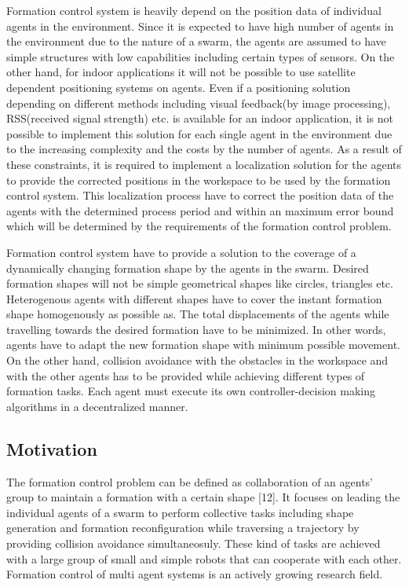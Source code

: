 \documentclass[twoside]{article}
\begin{document}
Formation control system is heavily depend on the position data of individual agents in the environment. Since it is expected to have high number of agents in the environment due to the nature of a swarm, the agents are assumed to have simple structures with low capabilities including certain types of sensors. On the other hand, for indoor applications it will not be possible to use satellite dependent positioning systems on agents. Even if a positioning solution depending on different methods including visual feedback(by image processing), RSS(received signal strength) etc. is available for an indoor application, it is not possible to implement this solution for each single agent in the environment due to the increasing complexity and the costs by the number of agents. As a result of these constraints, it is required to implement a localization solution for the agents to provide the corrected positions in the workspace to be used by the formation control system. This localization process have to correct the position data of the agents with the determined process period and within an maximum error bound which will be determined by the requirements of the formation control problem. 

Formation control system have to provide a solution to the coverage of a dynamically changing formation shape by the agents in the swarm. Desired formation shapes will not be simple geometrical shapes like circles, triangles etc.  Heterogenous agents with different shapes have to cover the instant formation shape homogenously as possible as. The total displacements of the agents while travelling towards the desired formation have to be minimized. In other words, agents have to adapt the new formation shape with minimum possible movement. On the other hand, collision avoidance with the obstacles in the workspace and with the other agents has to be provided while achieving different types of formation tasks. Each agent must execute its own controller-decision making algorithms in a decentralized manner. 
\subsection{Motivation}

The formation control problem can be defined as collaboration of an agents' group to maintain a formation with a certain shape [12]. It focuses on leading the individual agents of a swarm to perform  collective tasks including shape generation and formation reconfiguration while traversing a trajectory by providing collision avoidance simultaneosuly. These kind of tasks are achieved with a large group of small and simple robots  that can cooperate with each other. Formation control of multi agent systems  is an actively growing research field.\newline 
\end{document}
